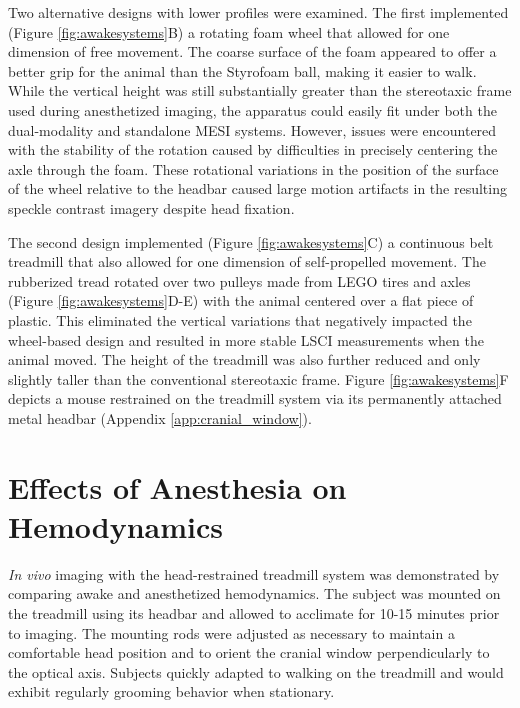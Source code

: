 Two alternative designs with lower profiles were examined. The first implemented (Figure \ref{fig:awakesystems}B) a rotating foam wheel \cite{Heiney:2018gq} that allowed for one dimension of free movement. The coarse surface of the foam appeared to offer a better grip for the animal than the Styrofoam ball, making it easier to walk. While the vertical height was still substantially greater than the stereotaxic frame used during anesthetized imaging, the apparatus could easily fit under both the dual-modality and standalone MESI systems. However, issues were encountered with the stability of the rotation caused by difficulties in precisely centering the axle through the foam. These rotational variations in the position of the surface of the wheel relative to the headbar caused large motion artifacts in the resulting speckle contrast imagery despite head fixation.

The second design implemented (Figure \ref{fig:awakesystems}C) a continuous belt treadmill \cite{Royer:2012gw, Kaifosh:2013fy} that also allowed for one dimension of self-propelled movement. The rubberized tread rotated over two pulleys made from LEGO tires and axles (Figure \ref{fig:awakesystems}D-E) with the animal centered over a flat piece of plastic. This eliminated the vertical variations that negatively impacted the wheel-based design and resulted in more stable LSCI measurements when the animal moved. The height of the treadmill was also further reduced and only slightly taller than the conventional stereotaxic frame. Figure \ref{fig:awakesystems}F depicts a mouse restrained on the treadmill system via its permanently attached metal headbar (Appendix \ref{app:cranial_window}).



\section{Effects of Anesthesia on Hemodynamics}

\textit{In vivo} imaging with the head-restrained treadmill system was demonstrated by comparing awake and anesthetized hemodynamics. The subject was mounted on the treadmill using its headbar and allowed to acclimate for 10-15 minutes prior to imaging. The mounting rods were adjusted as necessary to maintain a comfortable head position and to orient the cranial window perpendicularly to the optical axis. Subjects quickly adapted to walking on the treadmill and would exhibit regularly grooming behavior when stationary.

